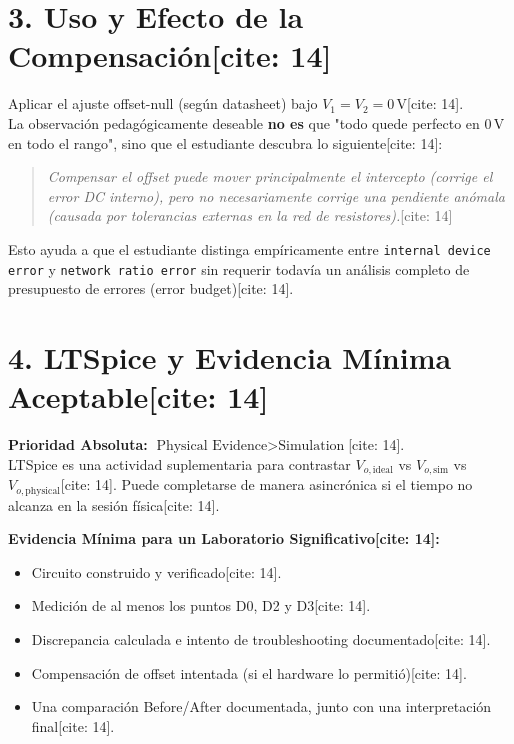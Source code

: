 \documentclass[11pt, a4paper]{article}
\begin{document}
\section*{3. Uso y Efecto de la Compensación[cite: 14]}
Aplicar el ajuste offset-null (según datasheet) bajo $V_1=V_2=0\,\text{V}$[cite: 14]. \\
La observación pedagógicamente deseable \textbf{no es} que "todo quede perfecto en $0\,\text{V}$ en todo el rango", sino que el estudiante descubra lo siguiente[cite: 14]:
\begin{quote}
    \textit{Compensar el offset puede mover principalmente el intercepto (corrige el error DC interno), pero no necesariamente corrige una pendiente anómala (causada por tolerancias externas en la red de resistores).}[cite: 14]
\end{quote}
Esto ayuda a que el estudiante distinga empíricamente entre \texttt{internal device error} y \texttt{network ratio error} sin requerir todavía un análisis completo de presupuesto de errores (error budget)[cite: 14].

\section*{4. LTSpice y Evidencia Mínima Aceptable[cite: 14]}
\textbf{Prioridad Absoluta:} $\boxed{\text{Physical Evidence} > \text{Simulation}}$[cite: 14]. \\
LTSpice es una actividad suplementaria para contrastar $V_{o,\mathrm{ideal}}$ vs $V_{o,\mathrm{sim}}$ vs $V_{o,\mathrm{physical}}$[cite: 14]. Puede completarse de manera asincrónica si el tiempo no alcanza en la sesión física[cite: 14].

\textbf{Evidencia Mínima para un Laboratorio Significativo[cite: 14]:}
\begin{itemize}
    \item Circuito construido y verificado[cite: 14].
    \item Medición de al menos los puntos D0, D2 y D3[cite: 14].
    \item Discrepancia calculada e intento de troubleshooting documentado[cite: 14].
    \item Compensación de offset intentada (si el hardware lo permitió)[cite: 14].
    \item Una comparación Before/After documentada, junto con una interpretación final[cite: 14].
\end{itemize}
\end{document}
